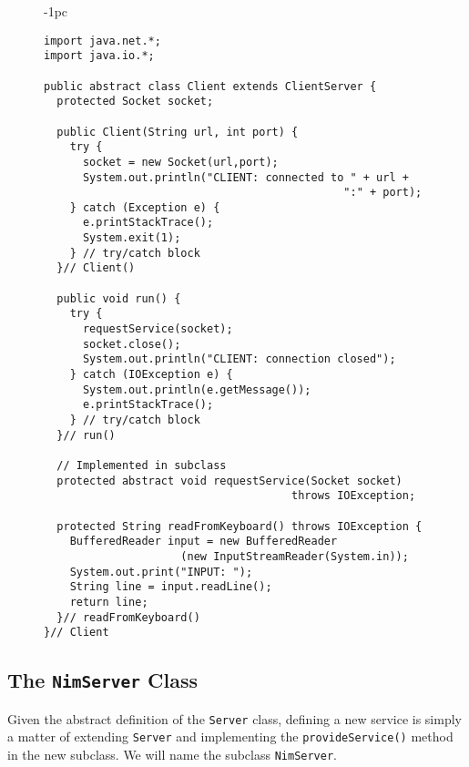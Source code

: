 \begin{figure}[htb]
\jjjprogstart
\begin{jjjlistingleft}[27pc]{-1pc}
\begin{lstlisting}
import java.net.*;
import java.io.*;

public abstract class Client extends ClientServer {
  protected Socket socket;

  public Client(String url, int port) {
    try {
      socket = new Socket(url,port);
      System.out.println("CLIENT: connected to " + url + 
                                              ":" + port);
    } catch (Exception e) {
      e.printStackTrace();
      System.exit(1);
    } // try/catch block
  }// Client()

  public void run() {
    try {
      requestService(socket);
      socket.close();
      System.out.println("CLIENT: connection closed");
    } catch (IOException e) {
      System.out.println(e.getMessage());
      e.printStackTrace();
    } // try/catch block
  }// run()

  // Implemented in subclass
  protected abstract void requestService(Socket socket) 
                                      throws IOException;

  protected String readFromKeyboard() throws IOException {
    BufferedReader input = new BufferedReader 
                     (new InputStreamReader(System.in));
    System.out.print("INPUT: ");
    String line = input.readLine();
    return line;
  }// readFromKeyboard()
}// Client
\end{lstlisting}
\end{jjjlistingleft}
\end{figure}

\subsection{The {\tt NimServer} Class}

Given the abstract definition of the {\tt Server} class, defining a
new service is simply a matter of extending {\tt Server} and
 implementing the {\tt provideService()}
method in the new subclass. We will name the subclass {\tt NimServer}.

